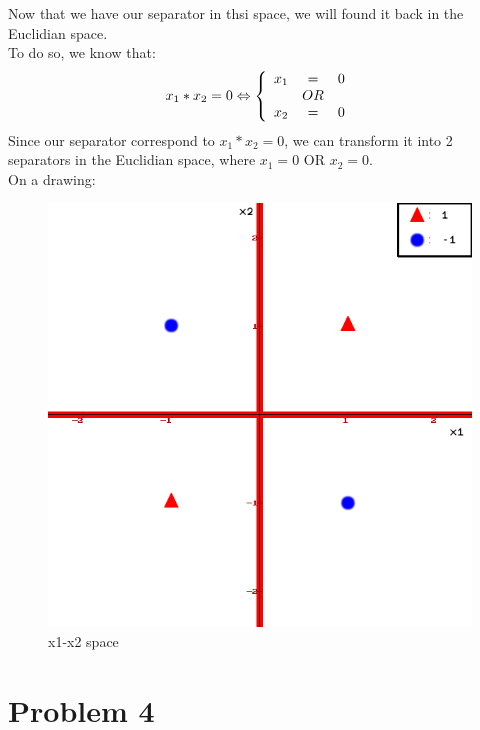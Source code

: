 \documentclass{article}
\begin{document}
            Now that we have our separator in thsi space, we will found it back in the Euclidian space.\\
            To do so, we know that:\\
            \[
                x_1*x_2=0 \Leftrightarrow\left\{
                    \begin{array}{r c l}
                        x_1 &=& 0\\
                        & OR & \\
                        x_2 &=& 0
                    \end{array}
                \right.
            \]
            Since our separator correspond to $x_1*x_2=0$, we can transform it into 2 separators in the Euclidian space, where $x_1=0$ OR $x_2=0$.\\
            On a drawing:
            \begin{figure}[H]
                \centering
                \includegraphics[scale=0.5]{problem3/x1-x2.png}
                \caption{x1-x2 space}
            \end{figure}



    \section{Problem 4}
\end{document}
